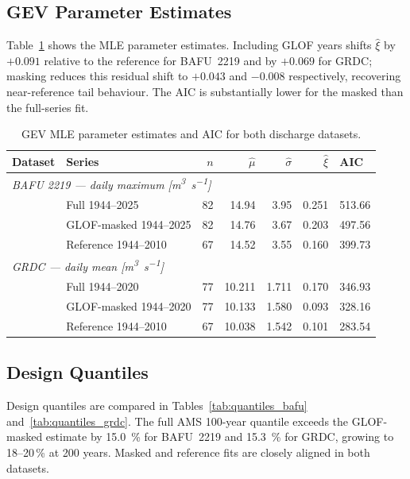 \subsection{GEV Parameter Estimates}
\label{sec:results:gev}

Table~\ref{tab:gev_params} shows the MLE parameter estimates. Including GLOF years shifts
$\hat{\xi}$ by $+0.091$ relative to the reference for BAFU~2219 and by $+0.069$ for
GRDC; masking reduces this residual shift to $+0.043$ and $-0.008$ respectively,
recovering near-reference tail behaviour. The AIC is substantially lower for the masked
than the full-series fit.

\begin{table}[H]
  \centering
  \caption{GEV MLE parameter estimates and AIC for both discharge datasets.}
  \label{tab:gev_params}
  \begin{tabular}{llrrrrl}
    \toprule
    Dataset & Series & $n$ & $\hat{\mu}$ & $\hat{\sigma}$ & $\hat{\xi}$ & AIC \\
    \midrule
    \multicolumn{7}{l}{\textit{BAFU 2219 — daily maximum [\si{m^3\per s}]}} \\[2pt]
     & Full 1944--2025        & 82 & 14.94 & 3.95 & 0.251 & 513.66 \\
     & GLOF-masked 1944--2025 & 82 & 14.76 & 3.67 & 0.203 & 497.56 \\
     & Reference 1944--2010   & 67 & 14.52 & 3.55 & 0.160 & 399.73 \\
    \midrule
    \multicolumn{7}{l}{\textit{GRDC — daily mean [\si{m^3\per s}]}} \\[2pt]
     & Full 1944--2020        & 77 & 10.211 & 1.711 & 0.170 & 346.93 \\
     & GLOF-masked 1944--2020 & 77 & 10.133 & 1.580 & 0.093 & 328.16 \\
     & Reference 1944--2010   & 67 & 10.038 & 1.542 & 0.101 & 283.54 \\
    \bottomrule
  \end{tabular}
\end{table}

\subsection{Design Quantiles}
\label{sec:results:quantiles}

Design quantiles are compared in Tables~\ref{tab:quantiles_bafu}
and~\ref{tab:quantiles_grdc}. The full AMS 100-year quantile exceeds the GLOF-masked
estimate by \SI{15.0}{\percent} for BAFU~2219 and \SI{15.3}{\percent} for GRDC, growing
to 18--20\,\% at 200 years. Masked and reference fits are closely aligned in both
datasets.

